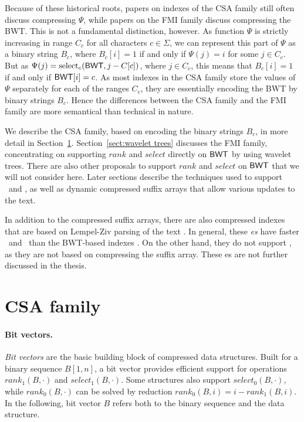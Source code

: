 Because of these historical roots, papers on indexes of the CSA family still often discuss compressing $\Psi$, while papers on the FMI family discuss compressing the BWT. This is not a fundamental distinction, however. As function $\Psi$ is strictly increasing in range $C_{c}$ for all characters $c \in \Sigma$, we can represent this part of $\Psi$ as a binary string $B_{c}$, where $B_{c}[i] = 1$ if and only if $\Psi(j) = i$ for some $j \in C_{c}$. But as $\Psi(j) = \operatorname{select}_{c}(\mathsf{BWT}, j - C[c])$, where $j \in C_{c}$, this means that $B_{c}[i] = 1$ if and only if $\mathsf{BWT}[i] = c$. As most indexes in the CSA family store the values of $\Psi$ separately for each of the ranges $C_{c}$, they are essentially encoding the BWT by binary strings $B_{c}$. Hence the differences between the CSA family and the FMI family are more semantical than technical in nature.

We describe the CSA family, based on encoding the binary strings $B_{c}$, in more detail in Section~\ref{sect:bit vectors}. Section~\ref{sect:wavelet trees} discusses the FMI family, concentrating on supporting $rank$ and $select$ directly on $\mathsf{BWT}$ by using wavelet trees. There are also other proposals \cite{Golynski2006,Barbay2010,Li2009} to support $rank$ and $select$ on $\mathsf{BWT}$ that we will not consider here. Later sections describe the techniques used to support \locate\ and \extract, as well as dynamic compressed suffix arrays that allow various updates to the text.

In addition to the compressed suffix arrays, there are also compressed indexes that are based on Lempel-Ziv parsing of the text \cite{Navarro2004,Ferragina2005a,Russo2008a,Kreft2011}. In general, these \emph{\lzindex{}es} have faster \locate\ and \extract\ than the BWT-based indexes \cite{Ferragina2009a}. On the other hand, they do not support \find, as they are not based on compressing the suffix array. These \lzindex{}es are not further discussed in the thesis.


\section{CSA family}\label{sect:bit vectors}

\paragraph{Bit vectors.}

\emph{Bit vectors} are the basic building block of compressed data structures. Built for a binary sequence $B[1,n]$, a bit vector provides efficient support for operations $rank_{1}(B, \cdot)$ and $select_{1}(B, \cdot)$. Some structures also support $select_{0}(B, \cdot)$, while $rank_{0}(B, \cdot)$ can be solved by reduction $rank_{0}(B, i) = i - rank_{1}(B, i)$. In the following, bit vector $B$ refers both to the binary sequence and the data structure.

